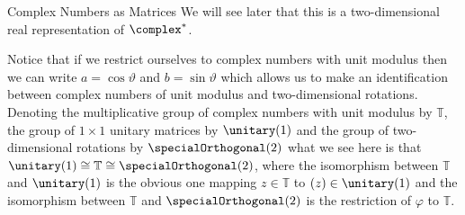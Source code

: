 \begin{exm}{Complex Numbers as Matrices}{}
    We will see later that this is a two-dimensional real representation of \(\complex^*\).
    
    Notice that if we restrict ourselves to complex numbers with unit modulus then we can write \(a = \cos\vartheta\) and \(b = \sin\vartheta\) which allows us to make an identification between complex numbers of unit modulus and two-dimensional rotations.
    Denoting the multiplicative group of complex numbers with unit modulus by \(\mathbb{T}\), the group of \(1\times 1\) unitary matrices by \(\unitary(1)\) and the group of two-dimensional rotations by \(\specialOrthogonal(2)\) what we see here is that \(\unitary(1) \isomorphic \mathbb{T} \isomorphic \specialOrthogonal(2)\), where the isomorphism between \(\mathbb{T}\) and \(\unitary(1)\) is the obvious one mapping \(z \in \mathbb{T}\) to \((z) \in \unitary(1)\) and the isomorphism between \(\mathbb{T}\) and \(\specialOrthogonal(2)\) is the restriction of \(\varphi\) to \(\mathbb{T}\).
\end{exm}

